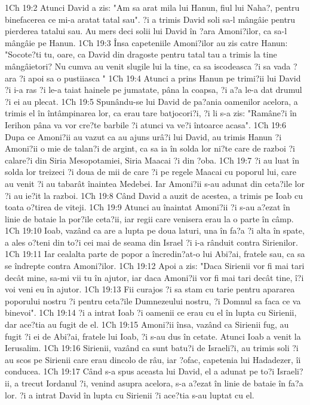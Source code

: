 1Ch 19:2  Atunci David a zis: "Am sa arat mila lui Hanun, fiul lui Naha?, pentru binefacerea ce mi-a aratat tatal sau". ?i a trimis David soli sa-l mângâie pentru pierderea tatalui sau. Au mers deci solii lui David în ?ara Amoni?ilor, ca sa-l mângâie pe Hanun.
1Ch 19:3  Însa capeteniile Amoni?ilor au zis catre Hanun: "Socote?ti tu, oare, ca David din dragoste pentru tatal tau a trimis la tine mângâietori? Nu cumva au venit slugile lui la tine, ca sa iscodeasca ?i sa vada ?ara ?i apoi sa o pustiiasca "
1Ch 19:4  Atunci a prins Hanun pe trimi?ii lui David ?i i-a ras ?i le-a taiat hainele pe jumatate, pâna la coapsa, ?i a?a le-a dat drumul ?i ei au plecat.
1Ch 19:5  Spunându-se lui David de pa?ania oamenilor acelora, a trimis el în întâmpinarea lor, ca erau tare batjocori?i, ?i li s-a zis: "Ramâne?i în Ierihon pâna va vor cre?te barbile ?i atunci va ve?i întoarce acasa".
1Ch 19:6  Dupa ce Amoni?ii au vazut ca au ajuns urâ?i lui David, au trimis Hanun ?i Amoni?ii o mie de talan?i de argint, ca sa ia în solda lor ni?te care de razboi ?i calare?i din Siria Mesopotamiei, Siria Maacai ?i din ?oba.
1Ch 19:7  ?i au luat în solda lor treizeci ?i doua de mii de care ?i pe regele Maacai cu poporul lui, care au venit ?i au tabarât înaintea Medebei. Iar Amoni?ii s-au adunat din ceta?ile lor ?i au ie?it la razboi.
1Ch 19:8  Când David a auzit de acestea, a trimis pe Ioab cu toata o?tirea de viteji.
1Ch 19:9  Atunci au înaintat Amoni?ii ?i s-au a?ezat în linie de bataie la por?ile ceta?ii, iar regii care venisera erau la o parte în câmp.
1Ch 19:10  Ioab, vazând ca are a lupta pe doua laturi, una în fa?a ?i alta în spate, a ales o?teni din to?i cei mai de seama din Israel ?i i-a rânduit contra Sirienilor.
1Ch 19:11  Iar cealalta parte de popor a încredin?at-o lui Abi?ai, fratele sau, ca sa se îndrepte contra Amoni?ilor.
1Ch 19:12  Apoi a zis: "Daca Sirienii vor fi mai tari decât mine, sa-mi vii tu în ajutor, iar daca Amoni?ii vor fi mai tari decât tine, î?i voi veni eu în ajutor.
1Ch 19:13  Fii curajos ?i sa stam cu tarie pentru apararea poporului nostru ?i pentru ceta?ile Dumnezeului nostru, ?i Domnul sa faca ce va binevoi".
1Ch 19:14  ?i a intrat Ioab ?i oamenii ce erau cu el în lupta cu Sirienii, dar ace?tia au fugit de el.
1Ch 19:15  Amoni?ii însa, vazând ca Sirienii fug, au fugit ?i ei de Abi?ai, fratele lui Ioab, ?i s-au dus în cetate. Atunci Ioab a venit la Ierusalim.
1Ch 19:16  Sirienii, vazând ca sunt batu?i de Israeli?i, au trimis soli ?i au scos pe Sirienii care erau dincolo de râu, iar ?ofac, capetenia lui Hadadezer, îi conducea.
1Ch 19:17  Când s-a spus aceasta lui David, el a adunat pe to?i Israeli?ii, a trecut Iordanul ?i, venind asupra acelora, s-a a?ezat în linie de bataie în fa?a lor. ?i a intrat David în lupta cu Sirienii ?i ace?tia s-au luptat cu el.
